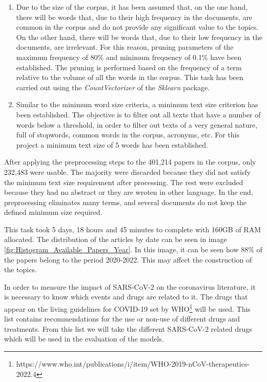\documentclass[a4paper,10pt]{article}
\begin{document}
\begin{enumerate}
    \item Due to the size of the corpus, it has been assumed that, on the one hand, there will be words that, due to their high frequency in the documents, are common in the corpus and do not provide any significant value to the topics. On the other hand, there will be words that, due to their low frequency in the documents, are irrelevant. For this reason, pruning parameters of the maximum frequency of 80\% and minimum frequency of 0.1\% have been established. The pruning is performed based on the frequency of a term relative to the volume of all the words in the corpus. This task has been carried out using the \textit{CountVectorizer} of the \textit{Sklearn} package.

    \item Similar to the minimum word size criteria, a minimum text size criterion has been established. The objective is to filter out all texts that have a number of words below a threshold, in order to filter out texts of a very general nature, full of stopwords, common words in the corpus, acronyms, etc. For this project a minimum text size of 5 words has been established.
\end{enumerate}


After applying the preprocessing steps to the 401,214 papers in the corpus, only 232,483 were usable. The majority were discarded because they did not satisfy the minimum text size requirement after processing. The rest were excluded because they had no abstract or they are wroten in other language. In the end, preprocessing eliminates many terms, and several documents do not keep the defined minimum size required.

This task took 5 days, 18 hours and 45 minutes to complete with 160GB of RAM allocated. The distribution of the articles by date can be seen in image \ref{fig:Histogram_Available_Papers_Year}. In this image, it can be seen how 88\% of the papers belong to the period 2020-2022. This may affect the construction of the topics.

In order to measure the impact of SARS-CoV-2 on the coronavirus literature, it is necessary to know which events and drugs are related to it. The drugs that appear on the living guidelines for COVID-19 set by WHO\footnote{https://www.who.int/publications/i/item/WHO-2019-nCoV-therapeutics-2022.4} will be used. This list contains recommendations for the use or non-use of different drugs and treatments. From this list we will take the different SARS-CoV-2 related drugs which will be used in the evaluation of the models.
\end{document}
